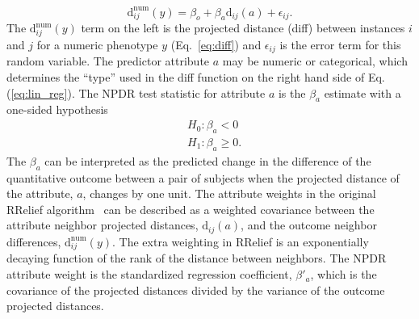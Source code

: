 \documentclass{bioinfo}
\begin{document}

%
%
\begin{equation}\label{eq:lin_reg}
    \text{d}^{\text{num}}_{ij}(y) = \beta_{o} + \beta_{a} \text{d}_{ij}(a) + \epsilon_{ij}.
\end{equation}
The $\text{d}^{\text{num}}_{ij}(y)$ term on the left is the projected distance (diff) between instances $i$ and $j$ for a numeric phenotype $y$ (Eq.~\ref{eq:diff}) and $\epsilon_{ij}$ is the error term for this random variable.
The predictor attribute $a$ may be numeric or categorical, which determines the ``type'' used in the diff function on the right hand side of Eq.(\ref{eq:lin_reg}).
The NPDR test statistic for attribute $a$ is the $\beta_a$ estimate with a one-sided hypothesis
\begin{equation}\label{eq:linreg_null}
\begin{aligned}
    & H_0: \beta_a < 0 \\
    & H_1: \beta_a \ge 0.
\end{aligned}
\end{equation}
The $\beta_a$ can be interpreted as the predicted change in the difference of the quantitative outcome between a pair of subjects when the projected distance of the attribute, $a$, changes by one unit.
The attribute weights in the original RRelief algorithm~\cite{robnik2003theoretical} can be described as a weighted covariance between the attribute neighbor projected distances, $\text{d}_{ij}(a)$, and the outcome neighbor differences, $\text{d}^{\text{num}}_{ij}(y)$.
The extra weighting in RRelief is an exponentially decaying function of the rank of the distance between neighbors.
The NPDR attribute weight is the standardized regression coefficient, $\beta'_a$, which is the covariance of the projected distances divided by the variance of the outcome projected distances.
\end{document}
